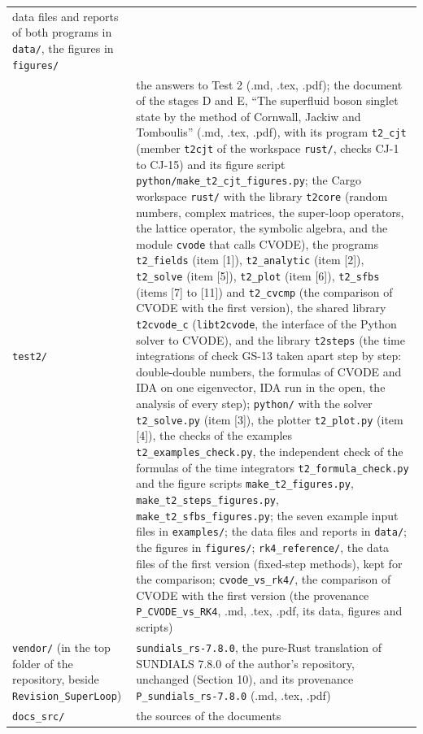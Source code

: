 \documentclass[
  10pt,
]{article}
\begin{document}
\begin{longtable}[]{@{}
  >{\raggedright\arraybackslash}p{}
  >{\raggedright\arraybackslash}p{}@{}}
data files and reports of both programs in \texttt{data/}, the figures
in \texttt{figures/} \\
\texttt{test2/} & the answers to Test 2 (.md, .tex, .pdf); the document
of the stages D and E, ``The superfluid boson singlet state by the
method of Cornwall, Jackiw and Tomboulis'' (.md, .tex, .pdf), with its
program \texttt{t2\_cjt} (member \texttt{t2cjt} of the workspace
\texttt{rust/}, checks CJ-1 to CJ-15) and its figure script
\texttt{python/make\_t2\_cjt\_figures.py}; the Cargo workspace
\texttt{rust/} with the library \texttt{t2core} (random numbers, complex
matrices, the super-loop operators, the lattice operator, the symbolic
algebra, and the module \texttt{cvode} that calls CVODE), the programs
\texttt{t2\_fields} (item {[}1{]}), \texttt{t2\_analytic} (item
{[}2{]}), \texttt{t2\_solve} (item {[}5{]}), \texttt{t2\_plot} (item
{[}6{]}), \texttt{t2\_sfbs} (items {[}7{]} to {[}11{]}) and
\texttt{t2\_cvcmp} (the comparison of CVODE with the first version), the
shared library \texttt{t2cvode\_c} (\texttt{libt2cvode}, the interface
of the Python solver to CVODE), and the library \texttt{t2steps} (the
time integrations of check GS-13 taken apart step by step: double-double
numbers, the formulas of CVODE and IDA on one eigenvector, IDA run in
the open, the analysis of every step); \texttt{python/} with the solver
\texttt{t2\_solve.py} (item {[}3{]}), the plotter \texttt{t2\_plot.py}
(item {[}4{]}), the checks of the examples
\texttt{t2\_examples\_check.py}, the independent check of the formulas
of the time integrators \texttt{t2\_formula\_check.py} and the figure
scripts \texttt{make\_t2\_figures.py},
\texttt{make\_t2\_steps\_figures.py},
\texttt{make\_t2\_sfbs\_figures.py}; the seven example input files in
\texttt{examples/}; the data files and reports in \texttt{data/}; the
figures in \texttt{figures/}; \texttt{rk4\_reference/}, the data files
of the first version (fixed-step methods), kept for the comparison;
\texttt{cvode\_vs\_rk4/}, the comparison of CVODE with the first version
(the provenance \texttt{P\_CVODE\_vs\_RK4}, .md, .tex, .pdf, its data,
figures and scripts) \\
\texttt{vendor/} (in the top folder of the repository, beside
\texttt{Revision\_SuperLoop}) & \texttt{sundials\_rs-7.8.0}, the
pure-Rust translation of SUNDIALS 7.8.0 of the author's repository,
unchanged (Section 10), and its provenance
\texttt{P\_sundials\_rs-7.8.0} (.md, .tex, .pdf) \\
\texttt{docs\_src/} & the sources of the documents \\
\end{longtable}
\end{document}
